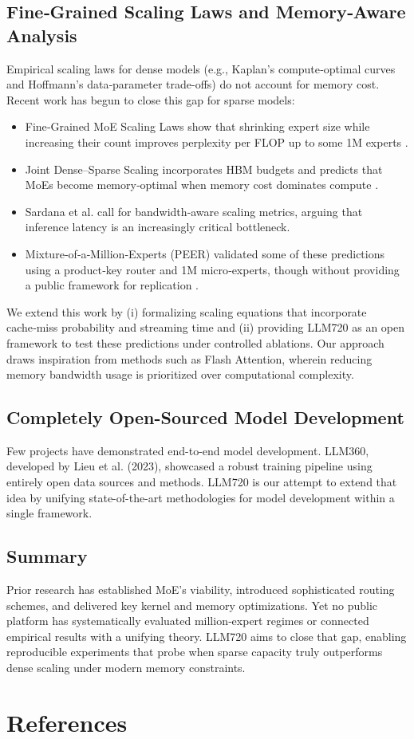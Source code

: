 \documentclass[12pt]{article}
\begin{document}
\subsection{Fine‑Grained Scaling Laws and Memory‑Aware Analysis}
Empirical scaling laws for dense models (e.g., Kaplan’s compute‑optimal curves and Hoffmann’s data‑parameter trade-offs) do not account for memory cost. Recent work has begun to close this gap for sparse models:
\begin{itemize}
  \item Fine‑Grained MoE Scaling Laws show that shrinking expert size while increasing their count improves perplexity per FLOP up to some 1M experts \cite{FineGrainedScaling2024}.
  \item Joint Dense–Sparse Scaling incorporates HBM budgets and predicts that MoEs become memory‑optimal when memory cost dominates compute \cite{MoEMemoryEfficiency2025}.
  \item Sardana et al. \cite{BeyondChinchilla2024} call for bandwidth‑aware scaling metrics, arguing that inference latency is an increasingly critical bottleneck.
  \item Mixture‑of‑a‑Million‑Experts (PEER) validated some of these predictions using a product‑key router and 1M micro‑experts, though without providing a public framework for replication \cite{MillionExperts2024}.
\end{itemize}
We extend this work by (i) formalizing scaling equations that incorporate cache‑miss probability and streaming time and (ii) providing LLM720 as an open framework to test these predictions under controlled ablations. Our approach draws inspiration from methods such as Flash Attention, wherein reducing memory bandwidth usage is prioritized over computational complexity.

\subsection{Completely Open-Sourced Model Development}
Few projects have demonstrated end-to-end model development. LLM360, developed by Lieu et al. (2023), showcased a robust training pipeline using entirely open data sources and methods. LLM720 is our attempt to extend that idea by unifying state-of-the-art methodologies for model development within a single framework.

\subsection{Summary}
Prior research has established MoE’s viability, introduced sophisticated routing schemes, and delivered key kernel and memory optimizations. Yet no public platform has systematically evaluated million‑expert regimes or connected empirical results with a unifying theory. LLM720 aims to close that gap, enabling reproducible experiments that probe when sparse capacity truly outperforms dense scaling under modern memory constraints.

\section*{References}


\end{document}
